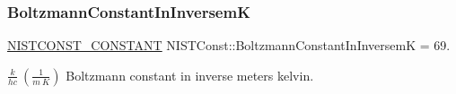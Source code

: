 \subsubsection{\texorpdfstring{Boltzmann\+Constant\+In\+InversemK}{BoltzmannConstantInInversemK}}
{\footnotesize\ttfamily \mbox{\hyperlink{_n_i_s_t_const_8hpp_a2b0fc1d7452373f816175dd86ce26729}{N\+I\+S\+T\+C\+O\+N\+S\+T\+\_\+\+C\+O\+N\+S\+T\+A\+NT}} N\+I\+S\+T\+Const\+::\+Boltzmann\+Constant\+In\+InversemK = 69.}

$\frac{k}{h c} \ (\frac{1}{m\ K})$ Boltzmann constant in inverse meters kelvin. 